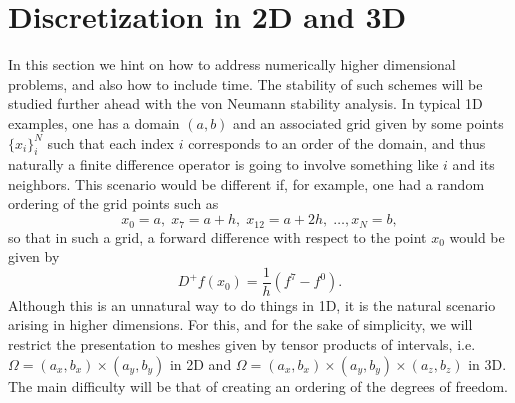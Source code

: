 \section{Discretization in 2D and 3D}
In this section we hint on how to address numerically higher dimensional problems, and also how to include time. The stability of such schemes will be studied further ahead with the von Neumann stability analysis. In typical 1D examples, one has a domain $(a,b)$ and an associated grid given by some points $\{x_i\}_i^N$ such that each index $i$ corresponds to an order of the domain, and thus naturally a finite difference operator is going to involve something like $i$ and its neighbors. This scenario would be different if, for example, one had a random ordering of the grid points such as
    \begin{equation*}
        x_0 = a,\; x_7 = a + h,\; x_{12} = a + 2h,\; \hdots, x_N = b,
    \end{equation*}
so that in such a grid, a forward difference with respect to the point $x_0$ would be given by
    \begin{equation*}
        D^+f(x_0) = \frac 1 h \left( f^7 - f^0 \right).
    \end{equation*}
Although this is an unnatural way to do things in 1D, it is the natural scenario arising in higher dimensions. For this, and for the sake of simplicity, we will restrict the presentation to meshes given by tensor products of intervals, i.e. $\Omega = (a_x, b_x) \times (a_y, b_y)$ in 2D and $\Omega = (a_x, b_x) \times (a_y, b_y) \times (a_z, b_z)$ in 3D. The main difficulty will be that of creating an ordering of the degrees of freedom.

